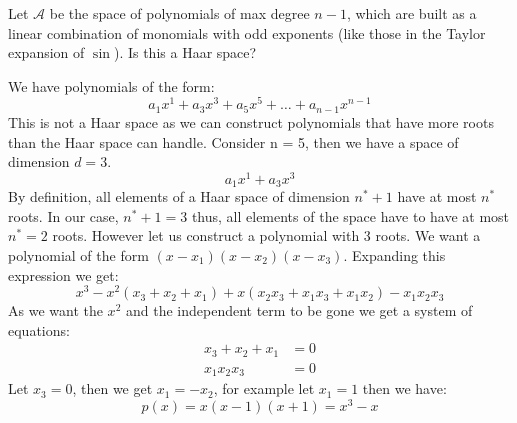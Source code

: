 \begin{problem}
Let $\mathcal{A}$ be the space of polynomials of max degree $n-1$, which are built as a linear combination of monomials with odd exponents (like those in the Taylor expansion of $\sin$). Is this a Haar space?
\end{problem}

\begin{solution}
We have polynomials of the form:
\begin{equation*}
a_1x^1+a_3x^3+a_5x^5+\ldots+a_{n-1}x^{n-1}
\end{equation*}
This is not a Haar space as we can construct polynomials that have more roots than the Haar space can handle. Consider n = 5, then we have a space of dimension $d=3$.
\begin{equation*}
a_1x^1+a_3x^3
\end{equation*}
By definition, all elements of a Haar space of dimension $n^*+1$ have at most $n^*$ roots. In our case, $n^*+1 = 3$ thus, all elements of the space have to have at most $n^*=2$ roots. However let us construct a polynomial with 3 roots. We want a polynomial of the form $(x-x_1)(x-x_2)(x-x_3)$. Expanding this expression we get:
\begin{equation*}
x^3-x^2(x_3+x_2+x_1)+x(x_2x_3+x_1x_3+x_1x_2)-x_1x_2x_3
\end{equation*}
As we want the $x^2$ and the independent term to be gone we get a system of equations:
\begin{align*}
x_3+x_2+x_1 &= 0 \\
x_1x_2x_3 &= 0
\end{align*}
Let $x_3 = 0$, then we get $x_1 = -x_2$, for example let $x_1 = 1$ then we have:
\begin{equation*}
p(x) = x(x-1)(x+1) = x^3-x
\end{equation*}
\end{solution}